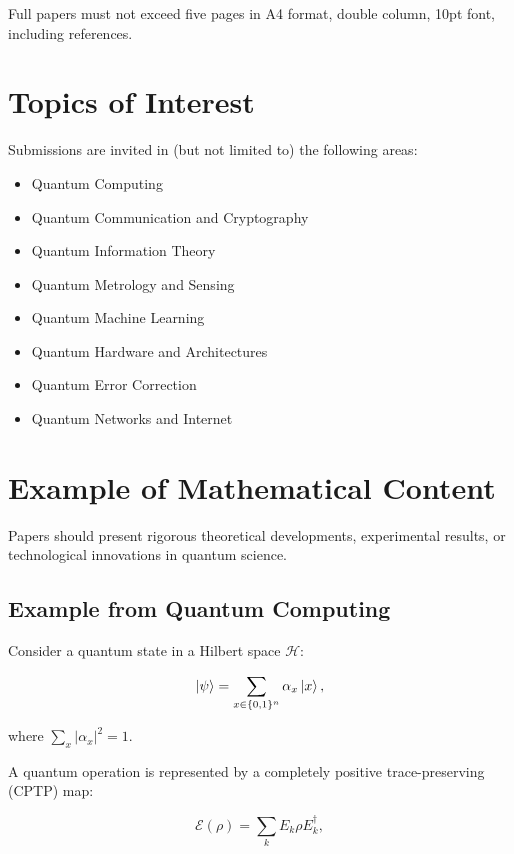 \documentclass{cbctq}
\begin{document}
Full papers must not exceed five pages in A4 format, double column, 10pt font, including references.

\section{Topics of Interest}
Submissions are invited in (but not limited to) the following areas:

\begin{itemize}
    \item Quantum Computing
    \item Quantum Communication and Cryptography
    \item Quantum Information Theory
    \item Quantum Metrology and Sensing
    \item Quantum Machine Learning
    \item Quantum Hardware and Architectures
    \item Quantum Error Correction
    \item Quantum Networks and Internet
\end{itemize}

\section{Example of Mathematical Content}

Papers should present rigorous theoretical developments, experimental results, or technological innovations in quantum science.
\subsection{Example from Quantum Computing}

Consider a quantum state in a Hilbert space $\mathcal{H}$:

\begin{equation}
    \ket{\psi} = \sum_{x \in \{0,1\}^n} \alpha_x \ket{x},
\end{equation}

where $\sum_x |\alpha_x|^2 = 1$.

A quantum operation is represented by a completely positive trace-preserving (CPTP) map:

\begin{equation}
    \mathcal{E}(\rho) = \sum_k E_k \rho E_k^\dagger,
\end{equation}
\end{document}
